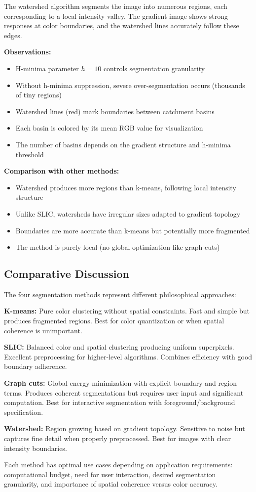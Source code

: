 \documentclass[11pt,a4paper]{article}
\begin{document}
The watershed algorithm segments the image into numerous regions, each corresponding to a local intensity valley. The gradient image shows strong responses at color boundaries, and the watershed lines accurately follow these edges.

\textbf{Observations:}
\begin{itemize}
    \item H-minima parameter $h = 10$ controls segmentation granularity
    \item Without h-minima suppression, severe over-segmentation occurs (thousands of tiny regions)
    \item Watershed lines (red) mark boundaries between catchment basins
    \item Each basin is colored by its mean RGB value for visualization
    \item The number of basins depends on the gradient structure and h-minima threshold
\end{itemize}

\textbf{Comparison with other methods:}
\begin{itemize}
    \item Watershed produces more regions than k-means, following local intensity structure
    \item Unlike SLIC, watersheds have irregular sizes adapted to gradient topology
    \item Boundaries are more accurate than k-means but potentially more fragmented
    \item The method is purely local (no global optimization like graph cuts)
\end{itemize}

\subsection{Comparative Discussion}

The four segmentation methods represent different philosophical approaches:

\textbf{K-means:} Pure color clustering without spatial constraints. Fast and simple but produces fragmented regions. Best for color quantization or when spatial coherence is unimportant.

\textbf{SLIC:} Balanced color and spatial clustering producing uniform superpixels. Excellent preprocessing for higher-level algorithms. Combines efficiency with good boundary adherence.

\textbf{Graph cuts:} Global energy minimization with explicit boundary and region terms. Produces coherent segmentations but requires user input and significant computation. Best for interactive segmentation with foreground/background specification.

\textbf{Watershed:} Region growing based on gradient topology. Sensitive to noise but captures fine detail when properly preprocessed. Best for images with clear intensity boundaries.

Each method has optimal use cases depending on application requirements: computational budget, need for user interaction, desired segmentation granularity, and importance of spatial coherence versus color accuracy.
\end{document}
